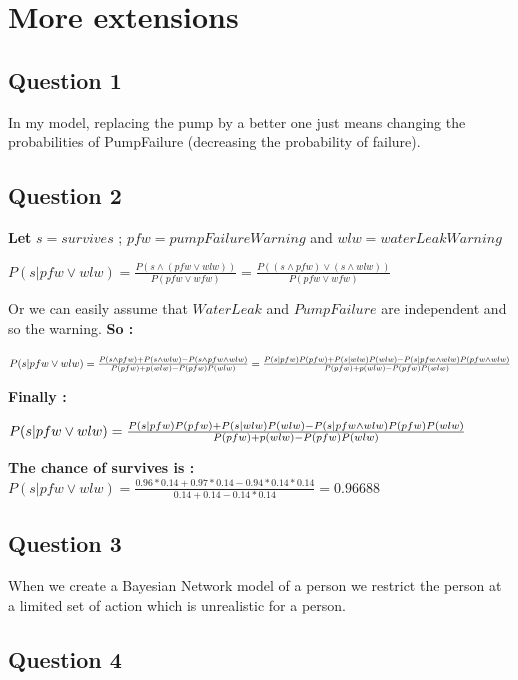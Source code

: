 \section{More extensions}

  \subsection{Question 1}

In my model, replacing the pump by a better one just means changing the probabilities of PumpFailure (decreasing the probability of failure). 

  \subsection{Question 2}

\textbf{Let} $s = survives$ ; $pfw = pumpFailureWarning$ and $wlw = waterLeakWarning$

$P(s | pfw \lor wlw) = \frac{P(s \land (pfw \lor wlw))}{P(pfw \lor wfw)}
  = \frac{P((s \land pfw) \lor (s \land wlw))}{P(pfw \lor wfw)}$

Or we can easily assume that $WaterLeak$ and $PumpFailure$ are independent and so the warning. \textbf{So :}

$P(s | pfw \lor wlw) = \frac{P(s \land pfw) + P(s \land wlw) - P(s \land pfw \land wlw)}{P(pfw) + p(wlw) - P(pfw)\*P(wlw)}
  = \frac{P(s|pfw)\*P(pfw) + P(s|wlw)\*P(wlw) - P(s|pfw \land wlw)\*P(pfw \land wlw)}{P(pfw) + p(wlw) - P(pfw)\*P(wlw)}$

\textbf{Finally :}

$P(s | pfw \lor wlw)  = \frac{P(s|pfw)\*P(pfw) + P(s|wlw)\*P(wlw) - P(s|pfw \land wlw)\*P(pfw)\*P(wlw)}{P(pfw) + p(wlw) - P(pfw)\*P(wlw)}$

\textbf{The chance of survives is :}
$P(s | pfw \lor wlw)  = \frac{0.96*0.14 + 0.97*0.14 - 0.94*0.14*0.14}{0.14 + 0.14 - 0.14*0.14} = 0.96688$

  \subsection{Question 3}

When we create a Bayesian Network model of a person we restrict the person at a limited set of action which is unrealistic for a person.

  \subsection{Question 4}

